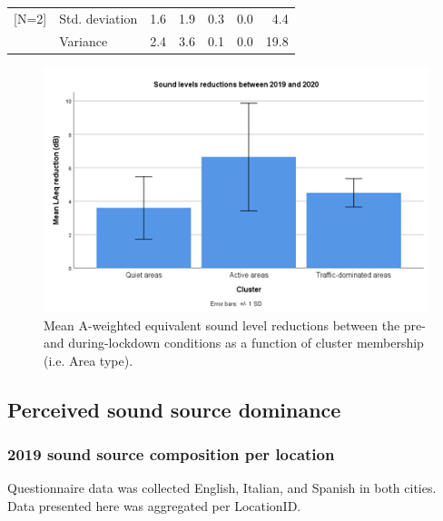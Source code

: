 \begin{table}[h]
{\begin{tabular}{llrrrrr}
      {[}N=2]                        & Std. deviation     & 1.6                                       & 1.9                           & 0.3                           & 0.0                     & 4.4                       \\
                                     & Variance           & 2.4                                       & 3.6                           & 0.1                           & 0.0                     & 19.8                      \\
      \bottomrule
    \end{tabular}
  }
\end{table}

\begin{figure}[h]
  \centering
  \includegraphics[width=\textwidth]{Figures/NoiseMappingLockdown Fig 8.png}
  \caption{Mean A-weighted equivalent sound level reductions between the pre- and during-lockdown conditions as a function of cluster membership (i.e. Area type). \label{fig:NsMapLockRedux}}
\end{figure}



 \subsection{Perceived sound source dominance}

   \subsubsection{2019 sound source composition per location}

   Questionnaire data was collected English, Italian, and Spanish in both cities. Data presented here was aggregated per LocationID.

